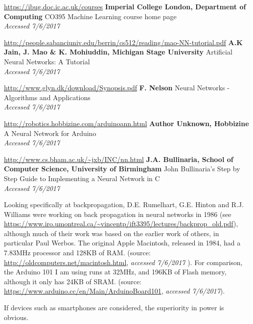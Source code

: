 \documentclass[a4paper]{article}
\begin{document}
\begin{thebibliography}{9}



\url{https://ibug.doc.ic.ac.uk/courses}
\textbf{Imperial College London, Department of Computing}
CO395 Machine Learning course home page
\\\textit{Accessed 7/6/2017}

\url{http://people.sabanciuniv.edu/berrin/cs512/reading/mao-NN-tutorial.pdf}
\textbf{A.K Jain, J. Mao \& K. Mohiuddin, Michigan Stage University}
Artificial Neural Networks: A Tutorial
\\\textit{Accessed 7/6/2017}

\url{http://www.glyn.dk/download/Synopsis.pdf}
\textbf{F. Nelson}
Neural Networks - Algorithms and Applications
\\\textit{Accessed 7/6/2017}

\url{http://robotics.hobbizine.com/arduinoann.html}
\textbf{Author Unknown, Hobbizine}
A Neural Network for Arduino
\\\textit{Accessed 7/6/2017}

\url{http://www.cs.bham.ac.uk/~jxb/INC/nn.html}
\textbf{J.A. Bullinaria, School of Computer Science, University of Birmingham}
John Bullinaria's Step by Step Guide to Implementing a Neural Network in C
\\\textit{Accessed 7/6/2017}

Looking specifically at backpropagation, D.E. Rumelhart, G.E. Hinton and R.J. Williams were working on back propagation in neural networks in 1986 (see \url{https://www.iro.umontreal.ca/~vincentp/ift3395/lectures/backprop_old.pdf}), although much of their work was based on the earlier work of others, in particular Paul Werbos. 
The original Apple Macintosh, released in 1984, had a 7.83MHz processor and 128KB of RAM. (source: \url{http://oldcomputers.net/macintosh.html}, \textit{accessed 7/6/2017}
). For comparison, the Arduino 101 I am using runs at 32MHz, and 196KB of Flash memory, although it only has 24KB of SRAM. (source: \url{https://www.arduino.cc/en/Main/ArduinoBoard101}, \textit{accessed 7/6/2017}).

If devices such as smartphones are considered, the superiority in power is obvious.


\end{thebibliography}
\end{document}
